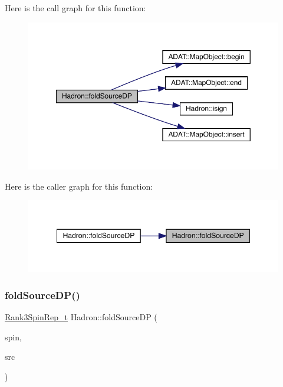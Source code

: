 Here is the call graph for this function\+:
\nopagebreak
\begin{figure}[H]
\begin{center}
\leavevmode
\includegraphics[width=350pt]{d1/daf/namespaceHadron_a3ea046027140669df443a45763de3e2c_cgraph}
\end{center}
\end{figure}
Here is the caller graph for this function\+:
\nopagebreak
\begin{figure}[H]
\begin{center}
\leavevmode
\includegraphics[width=348pt]{d1/daf/namespaceHadron_a3ea046027140669df443a45763de3e2c_icgraph}
\end{center}
\end{figure}
\mbox{\label{namespaceHadron_a9a1884dbfb0a2eb11bd7d4e6585e6966}} 
\subsubsection{\texorpdfstring{foldSourceDP()}{foldSourceDP()}\hspace{0.1cm}{\footnotesize\ttfamily [4/7]}}
{\footnotesize\ttfamily \mbox{\hyperlink{structHadron_1_1Rank3SpinRep__t}{Rank3\+Spin\+Rep\+\_\+t}} Hadron\+::fold\+Source\+DP (\begin{DoxyParamCaption}\item[{const \mbox{\hyperlink{structHadron_1_1Rank3SpinRep__t}{Rank3\+Spin\+Rep\+\_\+t}} \&}]{spin,  }\item[{bool}]{src }\end{DoxyParamCaption})}



